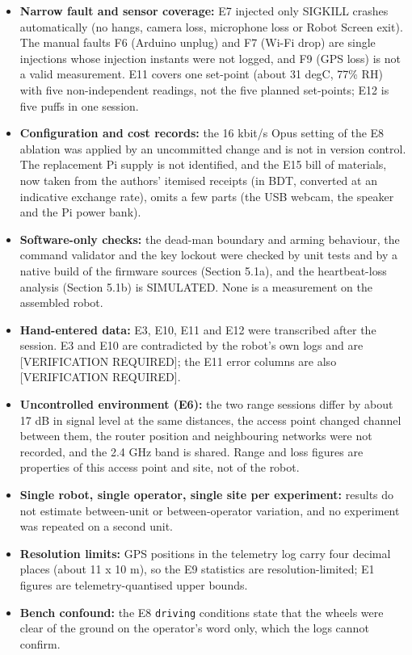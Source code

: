 \begin{itemize}
\item \textbf{Narrow fault and sensor coverage:} E7 injected only SIGKILL crashes automatically (no hangs, camera loss, microphone loss or Robot Screen exit). The manual faults F6 (Arduino unplug) and F7 (Wi-Fi drop) are single injections whose injection instants were not logged, and F9 (GPS loss) is not a valid measurement. E11 covers one set-point (about 31 degC, 77\% RH) with five non-independent readings, not the five planned set-points; E12 is five puffs in one session.
\item \textbf{Configuration and cost records:} the 16 kbit/s Opus setting of the E8 ablation was applied by an uncommitted change and is not in version control. The replacement Pi supply is not identified, and the E15 bill of materials, now taken from the authors' itemised receipts (in BDT, converted at an indicative exchange rate), omits a few parts (the USB webcam, the speaker and the Pi power bank).
\item \textbf{Software-only checks:} the dead-man boundary and arming behaviour, the command validator and the key lockout were checked by unit tests and by a native build of the firmware sources (Section 5.1a), and the heartbeat-loss analysis (Section 5.1b) is SIMULATED. None is a measurement on the assembled robot.
\item \textbf{Hand-entered data:} E3, E10, E11 and E12 were transcribed after the session. E3 and E10 are contradicted by the robot's own logs and are [VERIFICATION REQUIRED]; the E11 error columns are also [VERIFICATION REQUIRED].
\item \textbf{Uncontrolled environment (E6):} the two range sessions differ by about 17 dB in signal level at the same distances, the access point changed channel between them, the router position and neighbouring networks were not recorded, and the 2.4 GHz band is shared. Range and loss figures are properties of this access point and site, not of the robot.
\item \textbf{Single robot, single operator, single site per experiment:} results do not estimate between-unit or between-operator variation, and no experiment was repeated on a second unit.
\item \textbf{Resolution limits:} GPS positions in the telemetry log carry four decimal places (about 11 x 10 m), so the E9 statistics are resolution-limited; E1 figures are telemetry-quantised upper bounds.
\item \textbf{Bench confound:} the E8 \texttt{driving} conditions state that the wheels were clear of the ground on the operator's word only, which the logs cannot confirm.
\end{itemize}
